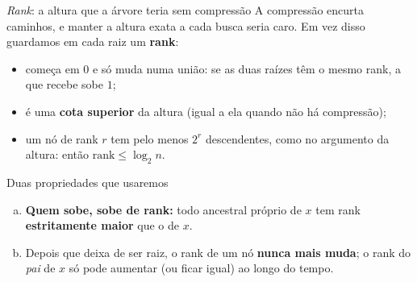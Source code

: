 \documentclass[aspectratio=169,10pt]{beamer}
\begin{document}
\begin{frame}[t]{\textit{Rank}: a altura que a árvore teria sem compressão}
  \small
  A compressão encurta caminhos, e manter a altura exata a cada busca
  seria caro.  Em vez disso guardamos em cada raiz um \textbf{rank}:
  \begin{itemize}
  \item começa em $0$ e só muda numa união: se as duas raízes têm o
    mesmo rank, a que recebe sobe $1$;
  \item é uma \textbf{cota superior} da altura (igual a ela quando não
    há compressão);
  \item um nó de rank $r$ tem pelo menos $2^r$ descendentes, como no
    argumento da altura: então $\mathrm{rank}\leq\log_2n$.
  \end{itemize}

  \medskip
  \begin{block}{Duas propriedades que usaremos}
    \begin{enumerate}[(a)]
    \item \textbf{Quem sobe, sobe de rank:} todo ancestral próprio de
      $x$ tem rank \textbf{estritamente maior} que o de $x$.
    \item Depois que deixa de ser raiz, o rank de um nó \textbf{nunca
        mais muda}; o rank do \textit{pai} de $x$ só pode aumentar
      (ou ficar igual) ao longo do tempo.
    \end{enumerate}
  \end{block}
\end{frame}
\end{document}
